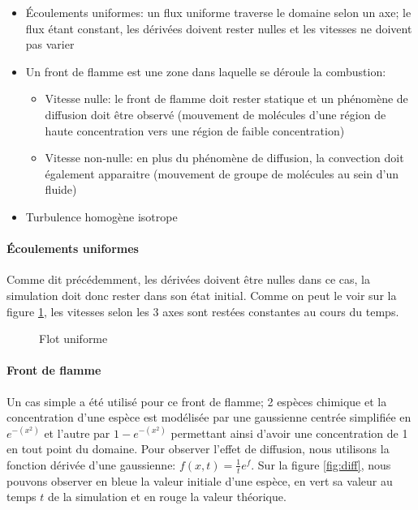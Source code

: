 \begin{itemize}
\item Écoulements uniformes: un flux uniforme traverse le domaine selon un axe; le flux étant constant, les dérivées doivent rester nulles et les vitesses ne doivent pas varier
\item Un front de flamme est une zone dans laquelle se déroule la combustion:
  \begin{itemize}
  \item Vitesse nulle: le front de flamme doit rester statique et un phénomène de diffusion doit être observé (mouvement de molécules d'une région de haute concentration vers une région de faible concentration)
  \item Vitesse non-nulle: en plus du phénomène de diffusion, la convection doit également apparaitre (mouvement de groupe de molécules au sein d'un fluide)
  \end{itemize}
\item Turbulence homogène isotrope
\end{itemize}

\paragraph{Écoulements uniformes}
Comme dit précédemment, les dérivées doivent être nulles dans ce cas, la simulation doit donc rester dans son état initial. Comme on peut le voir sur la figure \ref{fig:uniform_flow}, les vitesses selon les 3 axes sont restées constantes au cours du temps.
 
\begin{figure}[ht]
  \centering
  \caption{\label{fig:uniform_flow}Flot uniforme}
\end{figure}

\paragraph{Front de flamme}
Un cas simple a été utilisé pour ce front de flamme; 2 espèces chimique et la concentration d'une espèce est modélisée par une gaussienne centrée simplifiée en $e^{-(x^2)}$ et l'autre par $1-e^{-(x^2)}$ permettant ainsi d'avoir une concentration de 1 en tout point du domaine. Pour observer l'effet de diffusion, nous utilisons la fonction dérivée d'une gaussienne: $f(x,t)=\frac{1}{t}e^{f}$. Sur la figure \ref{fig:diff}, nous pouvons observer en bleue la valeur initiale d'une espèce, en vert sa valeur au temps $t$ de la simulation et en rouge la valeur théorique.

